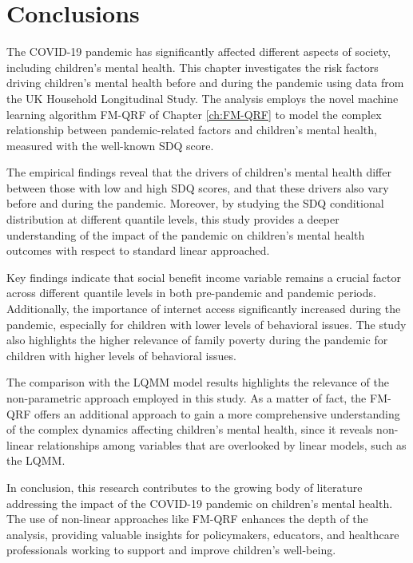 

\section{Conclusions}
\label{sec:SDQ-conclusions}

The COVID-19 pandemic has significantly affected different aspects of society, including children's mental health. This chapter investigates the risk factors driving children's mental health before and during the pandemic using data from the UK Household Longitudinal Study. The analysis employs the novel machine learning algorithm FM-QRF of Chapter \ref{ch:FM-QRF} to model the complex relationship between pandemic-related factors and children's mental health, measured with the well-known SDQ score.

\vspace{0.15in}

\noindent The empirical findings reveal that the drivers of children's mental health differ between those with low and high SDQ scores, and that these drivers also vary before and during the pandemic. Moreover, by studying the SDQ conditional distribution at different quantile levels, this study provides a deeper understanding of the impact of the pandemic on children's mental health outcomes with respect to standard linear approached.

\vspace{0.15in}

\noindent Key findings indicate that social benefit income variable remains a crucial factor across different quantile levels in both pre-pandemic and pandemic periods. Additionally, the importance of internet access significantly increased during the pandemic, especially for children with lower levels of behavioral issues. The study also highlights the higher relevance of family poverty during the pandemic for children with higher levels of behavioral issues.

\vspace{0.15in}

\noindent The comparison with the LQMM model results highlights the relevance of the non-parametric approach employed in this study. As a matter of fact, the FM-QRF  offers an additional approach to gain a more comprehensive understanding of the complex dynamics affecting children's mental health, since it reveals non-linear relationships among variables that are overlooked by linear models, such as the LQMM.

\vspace{0.15in}

\noindent In conclusion, this research contributes to the growing body of literature addressing the impact of the COVID-19 pandemic on children's mental health. The use of non-linear approaches like FM-QRF enhances the depth of the analysis, providing valuable insights for policymakers, educators, and healthcare professionals working to support and improve children's well-being.

